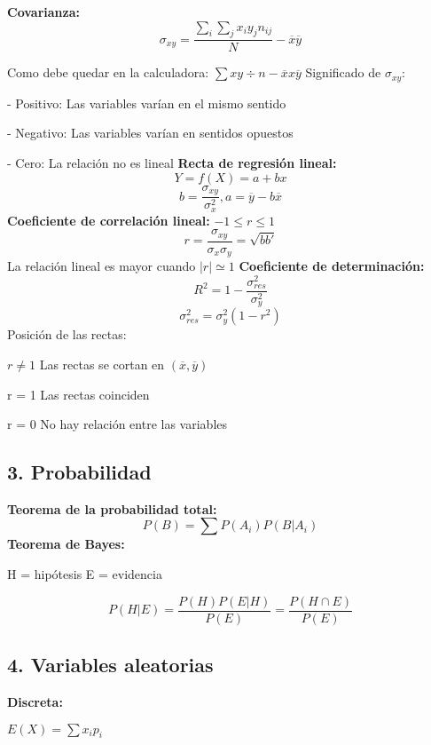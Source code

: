 \documentclass[12pt,a4paper]{report}
\begin{document}
\textbf{Covarianza: } \[ \sigma_{xy} =
\frac { \sum _ {i} { \sum _ {j} { x_i y_j n_{ij} } }}{N} - \overline x \overline y \]

Como debe quedar en la calculadora: $ \sum xy \div n - \overline x x \overline y $
\newline
\newline
Significado de $\sigma _ {xy} $:

- Positivo: Las variables varían en el mismo sentido

- Negativo: Las variables varían en sentidos opuestos

- Cero: La relación no es lineal
\newline
\newline
\textbf{Recta de regresión lineal: }
\[Y = f(X) = a + bx \]
\[ b = \frac {\sigma _{xy}}{\sigma _ x ^ 2} , a = \overline y - b \overline x \]
\textbf{Coeficiente de correlación lineal: }
\newline
$ -1 \leqslant r \leqslant 1 $
\[ r = \frac {\sigma _ {xy}}{\sigma _ x \sigma _ y} = \sqrt{b b'}\]
La relación lineal es mayor cuando $|r| \simeq 1$
\newline
\textbf{Coeficiente de determinación: }
\[ R ^ 2 = 1 - \frac{\sigma _ {res} ^ 2}{\sigma _ y ^ 2}\]
\[ \sigma _ {res} ^ 2 = \sigma _ y ^ 2 (1 - r ^ 2 ) \]
Posición de las rectas:

$r \neq 1$ Las rectas se cortan en $(\overline x , \overline y )$

r = 1 Las rectas coinciden

r = 0 No hay relación entre las variables

\newpage
\subsection*{3. Probabilidad}
\textbf{Teorema de la probabilidad total: }
\[ P(B) = \sum P(A_i) P(B|A_i) \]
\textbf { Teorema de Bayes: }

H = hipótesis
E = evidencia

\[ P(H|E) = \frac {P(H) P(E|H)}{P(E)} = \frac {P(H \cap E)} {P(E)} \]

\newpage
\subsection*{4. Variables aleatorias }
\textbf{Discreta: }
\newline

$E(X) = \sum x_i p_i $
\newline
\end{document}
